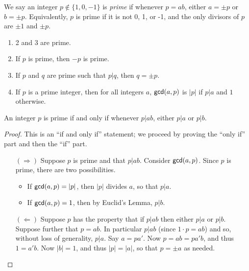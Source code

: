 \begin{dfn}[Prime]
We say an integer \(p \notin \{1,0,-1\}\) is \emph{prime} if whenever \(p = ab\), either \(a = \pm p\) or \(b = \pm p\). Equivalently, \(p\) is prime if it is not 0, 1, or -1, and the only divisors of \(p\) are \(\pm 1\) and \(\pm p\).
\end{dfn}

\begin{prop} \mbox{}
\begin{enumerate}
\item 2 and 3 are prime.
\item If \(p\) is prime, then \(-p\) is prime.
\item If \(p\) and \(q\) are prime such that \(p|q\), then \(q = \pm p\).
\item If \(p\) is a prime integer, then for all integers \(a\), \(\mathsf{gcd}(a, p)\) is \(|p|\) if \(p|a\) and \(1\) otherwise.
\end{enumerate}
\end{prop}

\begin{prop}
An integer \(p\) is prime if and only if whenever \(p|ab\), either \(p|a\) or \(p|b\).
\end{prop}

\begin{proof}
This is an ``if and only if'' statement; we proceed by proving the ``only if'' part and then the ``if'' part.
\begin{itemize}
\item[\((\Rightarrow)\)] Suppose \(p\) is prime and that \(p|ab\). Consider \(\mathsf{gcd}(a, p)\). Since \(p\) is prime, there are two possibilities.
\begin{itemize}
\item If \(\mathsf{gcd}(a, p) = |p|\), then \(|p|\) divides \(a\), so that \(p|a\).
\item If \(\mathsf{gcd}(a, p) = 1\), then by Euclid's Lemma, \(p|b\).
\end{itemize}

\item[\((\Leftarrow)\)] Suppose \(p\) has the property that if \(p|ab\) then either \(p|a\) or \(p|b\). Suppose further that \(p = ab\). In particular \(p|ab\) (since \(1 \cdot p = ab\)) and so, without loss of generality, \(p|a\). Say \(a = pa'\). Now \(p = ab = pa'b\), and thus \(1 = a'b\). Now \(|b| = 1\), and thus \(|p| = |a|\), so that \(p = \pm a\) as needed. \qedhere
\end{itemize}
\end{proof}

